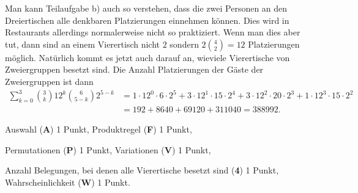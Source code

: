 \begin{diskussion}
Man kann Teilaufgabe b) auch so verstehen, dass die zwei Personen an
den Dreiertischen alle denkbaren Platzierungen einnehmen können.
Dies wird in Restaurants allerdings normalerweise nicht so praktiziert.
Wenn man dies aber tut, dann sind an einem Vierertisch nicht $2$ sondern
$2 \binom{4}{2}=12$ Platzierungen möglich.
Natürlich kommt es jetzt auch darauf an, wieviele Vierertische von 
Zweiergruppen besetzt sind.
Die Anzahl Platzierungen der Gäste der Zweiergruppen ist dann
\begin{align*}
\sum_{k=0}^3 \binom{3}{k}12^k\binom{6}{5-k}2^{5-k}
&=
1\cdot 12^0\cdot 6\cdot 2^5
+
3\cdot 12^1\cdot 15\cdot 2^4
+
3\cdot 12^2\cdot 20\cdot 2^3
+
1\cdot 12^3\cdot 15\cdot 2^2
\\
&=
192 + 8640 + 69120 + 311040
=
388992.
\end{align*}

\end{diskussion}

\begin{bewertung}
\begin{teilaufgaben}
\item
Auswahl ({\bf A}) 1 Punkt, Produktregel ({\bf F}) 1 Punkt,
\item
Permutationen ({\bf P}) 1 Punkt, Variationen ({\bf V}) 1 Punkt,
\item
Anzahl Belegungen, bei denen alle Vierertische besetzt sind
({\bf 4}) 1 Punkt,
Wahrscheinlichkeit ({\bf W}) 1 Punkt.
\end{teilaufgaben}
\end{bewertung}



